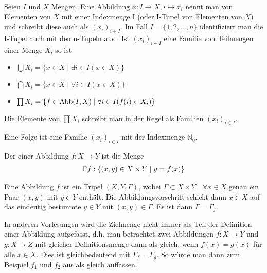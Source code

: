 \begin{definition}[Familie]
	Seien $I$ und $X$ Mengen. Eine Abbildung $x: I \to X, i \mapsto
	x_i$ nennt man  von Elementen von $X$ mit einer Indexmenge I (oder I-Tupel von 
	Elementen von $X$) und schreibt diese auch als $(x_i)_{i \in I}$. Im Fall $I=\{1,2,...,n\}$
	identifiziert man die I-Tupel auch mit den n-Tupeln aus . Ist $(x_i)_{i \in I}$ eine Familie von
	Teilmengen einer Menge $X$, so ist 
	\begin{itemize}
		\item $\bigcup X_i = \{x \in X \mid \exists i \in I(x \in X)\}$
		\item $\bigcap X_i = \{x \in X \mid \forall i \in I(x \in X)\}$
		\item $\prod X_i = \{f \in \operatorname{Abb}(I,X) \mid \forall i \in I(f(i) \in X_i)\}$
	\end{itemize}
	Die Elemente von $\prod X_i$ schreibt man in der Regel als Familien $(x_i)_{i \in I}$.
\end{definition}

\begin{example}
	Eine Folge ist eine Familie $(x_i)_{i \in I}$ mit der Indexmenge $\mathbb{N}_0$.
\end{example}

\begin{definition}[Graph]
	Der  einer Abbildung $f: X \to Y$ ist die Menge
	\begin{align}
		\Gamma f: \{(x,y) \in X \times Y \mid y=f(x)\}\notag
	\end{align}
\end{definition}

\begin{remark}
	Eine Abbildung $f$ ist ein Tripel $(X,Y,\Gamma)$, wobei $\Gamma \subset X \times Y \quad \forall
	x \in X$ genau ein Paar $(x,y)$ mit $y \in Y$ enthält. Die Abbildungsvorschrift schickt dann
	$x \in X$ auf das eindeutig bestimmte $y \in Y$ mit $(x,y) \in \Gamma$. Es ist dann $\Gamma =
	\Gamma_f$.
\end{remark}

\begin{remark}
	In anderen Vorlesungen wird die Zielmenge nicht immer als Teil der Definition einer Abbildung aufgefasst, d.h. man betrachtet zwei Abbildungen $f:X\to Y$ und $g:X\to Z$ mit gleicher Definitionsmenge dann als gleich, wenn $f(x)=g(x)$ für alle $x\in X$. Dies ist gleichbedeutend mit $\Gamma_f=\Gamma_g$. So würde man dann zum Beispiel $f_1$ und $f_2$ aus  als gleich auffassen.
\end{remark}
